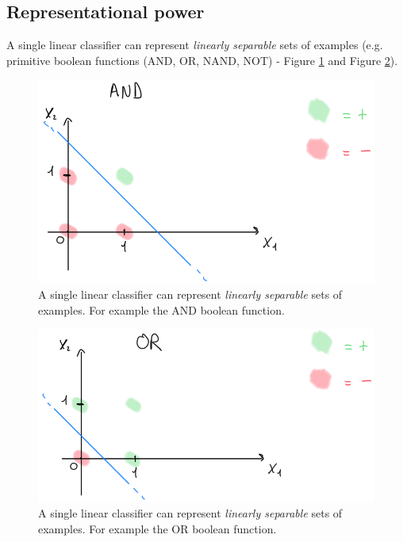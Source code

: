 \subsection{Representational power}
A single linear classifier can represent \textit{linearly separable} sets of examples (e.g. primitive boolean functions (AND, OR, NAND, NOT) - Figure \ref{fig:andPerceptron} and Figure \ref{fig:orPerceptron}). 

\begin{figure}
    \centering
    \includegraphics[scale=0.5]{images/andPerceptron.png}
    \caption{A single linear classifier can represent \textit{linearly separable} sets of examples. For example the AND boolean function.}
    \label{fig:andPerceptron}
\end{figure}

\begin{figure}
    \centering
    \includegraphics[scale=0.5]{images/orPerceptron.png}
    \caption{A single linear classifier can represent \textit{linearly separable} sets of examples. For example the OR boolean function.}
    \label{fig:orPerceptron}
\end{figure}

